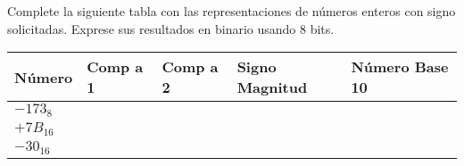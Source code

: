 \documentclass[addpoints]{exam}
\begin{document}
\begin{questions}

  \question[1 \half] Complete la siguiente tabla con las representaciones de
  números enteros con signo solicitadas. Exprese sus resultados en
  binario usando 8 bits.


  \begin{tabularx}{\textwidth}{|X|X|X|X|X|}
    \hline
    \textbf{Número} & \textbf{Comp a 1} & \textbf{Comp a 2} & \textbf{Signo Magnitud} & \textbf{Número Base 10} \\
    \hline
    $-173_{8}$ &  &  &  & \\
    \hline
    $+7B_{16}$ &  &  &  & \\
    \hline
    $-30_{16}$ &  &  &  & \\
    \hline
  \end{tabularx}








\end{questions}
\end{document}
